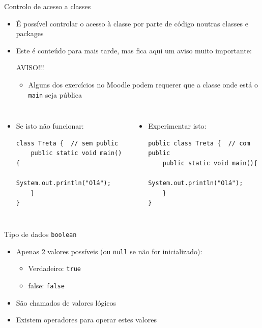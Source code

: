 \documentclass[portuguese, aspectratio=169, xcolor=table]{beamer}
\begin{document}
\begin{frame}[fragile]{Controlo de acesso a classes}
\begin{itemize}
    \item É possível controlar o acesso à classe por parte de código noutras classes e packages
    \item Este é conteúdo para mais tarde, mas fica aqui um aviso muito importante:
    \begin{alertblock}{AVISO!!!}
        \begin{itemize}
            \item Alguns dos exercícios no Moodle podem requerer que a classe onde está o \texttt{main} seja pública
        \end{itemize}
    \end{alertblock}
\end{itemize}
\begin{columns}
\begin{itemize}
\item Se isto não funcionar:
\begin{verbatim}
class Treta {  // sem public
    public static void main(){
        System.out.println("Olá");
    }
}
\end{verbatim}
\end{itemize}
\begin{itemize}
    \item Experimentar isto:
\begin{verbatim}
public class Treta {  // com public
    public static void main(){
        System.out.println("Olá");
    }
}
\end{verbatim}
\end{itemize}
\end{columns}
\end{frame}


\begin{frame}{Tipo de dados \texttt{boolean}}
\begin{itemize}
    \item Apenas 2 valores possíveis (ou \texttt{null} se não for inicializado):
    \begin{itemize}
        \item Verdadeiro: \texttt{true}
        \item false: \texttt{false} 
    \end{itemize}
\item São chamados de valores lógicos
\item Existem operadores para operar estes valores
\end{itemize}
\end{frame}
\end{document}
